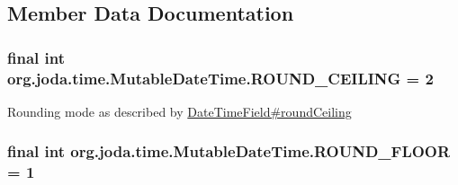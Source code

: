 \subsection{Member Data Documentation}
\hypertarget{classorg_1_1joda_1_1time_1_1_mutable_date_time_a49bfcacf438b1f423295460673c80b9c}{
\subsubsection[{R\-O\-U\-N\-D\-\_\-\-C\-E\-I\-L\-I\-N\-G}]{\setlength{\rightskip}{0pt plus 5cm}final int org.\-joda.\-time.\-Mutable\-Date\-Time.\-R\-O\-U\-N\-D\-\_\-\-C\-E\-I\-L\-I\-N\-G = 2\hspace{0.3cm}{\ttfamily [static]}}}\label{classorg_1_1joda_1_1time_1_1_mutable_date_time_a49bfcacf438b1f423295460673c80b9c}
Rounding mode as described by \hyperlink{classorg_1_1joda_1_1time_1_1_date_time_field_ab82dcd2e5a3b9c7d54f96a1e4dc2f9d7}{Date\-Time\-Field\#round\-Ceiling} \hypertarget{classorg_1_1joda_1_1time_1_1_mutable_date_time_aa3485f487dd253880c4a38a07ce3e6ab}{
\subsubsection[{R\-O\-U\-N\-D\-\_\-\-F\-L\-O\-O\-R}]{\setlength{\rightskip}{0pt plus 5cm}final int org.\-joda.\-time.\-Mutable\-Date\-Time.\-R\-O\-U\-N\-D\-\_\-\-F\-L\-O\-O\-R = 1\hspace{0.3cm}{\ttfamily [static]}}}\label{classorg_1_1joda_1_1time_1_1_mutable_date_time_aa3485f487dd253880c4a38a07ce3e6ab}
